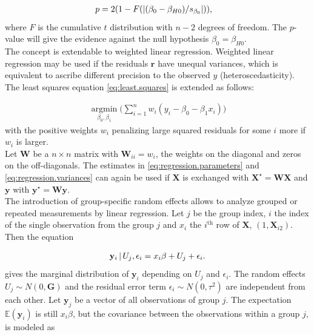 \documentclass[11pt,a4paper,twoside]{book}\usepackage[]{graphicx}\usepackage[]{color}
\begin{document}
\begin{align}
p &= 2(1-F(\left\lvert(\beta_0 - \beta_{H0})/s_{\beta_0}\right\rvert)), \nonumber
\end{align}
where $F$ is the cumulative $t$ distribution with $n-2$ degrees of freedom. The  $p$\hspace{0.4mm}-value will give the evidence against the null hypothesis $\beta_0 = \beta_{H0}$. \\
The concept is extendable to weighted linear regression. Weighted linear regression may be used if the residuals $\mathbf{r}$ have unequal variances, which is equivalent to ascribe different precision to the observed $y$ (heteroscedasticity). The least squares equation \eqref{eq:least.squares} is extended as follows:

\begin{align}
\operatorname*{argmin}_{\beta_0, \beta_1}\Big(\sum_{i = 1}^n w_i(y_i - \beta_0 - \beta_1 x_i)\Big) \nonumber
\end{align}
with the positive weights $w_i$ penalizing large squared residuals for some $i$ more if $w_i$ is larger. \\
Let $\mathbf{W}$ be a $n \times n$ matrix with $\mathbf{W}_{ii} = w_i$, the weights on the diagonal and zeros on the off-diagonals. The estimates in \eqref{eq:regression.parameters} and \eqref{eq:regression.variances} can again be used if $\mathbf{X}$ is exchanged with $\mathbf{X}^\star =  \mathbf{W} \mathbf{X}$ and $\mathbf{y}$ with $\mathbf{y}^\star = \mathbf{W} \mathbf{y}$. \label{weighted.regression} \\
The introduction of group-specific random effects allows to analyze grouped or repeated measurements by linear regression. Let $j$ be the group index, $i$ the index of the single observation from the group $j$ and $x_i$ the $i^\textrm{th}$ row of $\mathbf{X}$, $(1, \mathbf{X}_{i2})$. Then the equation

\begin{align}
\mathbf{y}_i \,\vert\, U_j,\epsilon_{i} =  x_i\beta + U_j + \epsilon_{i}. \label{eq:one.random.intercept}
\end{align}
gives the marginal distribution of $\mathbf{y}_i$ depending on $U{_j}$ and $\epsilon_i$. The random effects $U_j \sim N(0, \mathbf{G})$ and the residual error term $\epsilon_i \sim N(0, \tau^{2})$ are independent from each other. Let $\mathbf{y}_j$ be a vector of all observations of group $j$. The expectation $\mathbb{E}(\mathbf{y}_i)$ is still $x_i \beta$, but the covariance between the observations within a group $j$, is modeled as
\end{document}
